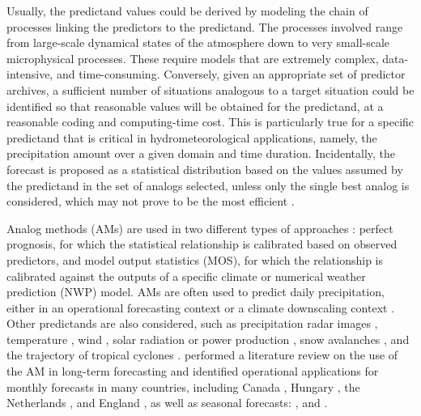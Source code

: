 \documentclass[review]{elsarticle}
\begin{document}
Usually, the predictand values could be derived by modeling the chain of processes linking the predictors to the predictand. The processes involved range from large-scale dynamical states of the atmosphere down to very small-scale microphysical processes. These require models that are extremely complex, data-intensive, and time-consuming. Conversely, given an appropriate set of predictor archives, a sufficient number of situations analogous to a target situation could be identified so that reasonable values will be obtained for the predictand, at a reasonable coding and computing-time cost. This is particularly true for a specific predictand that is critical in hydrometeorological applications, namely, the precipitation amount over a given domain and time duration. Incidentally, the forecast is proposed as a statistical distribution based on the values assumed by the predictand in the set of analogs selected, unless only the single best analog is considered, which may not prove to be the most efficient \citep{Bontron2005}.

Analog methods (AMs) are used in two different types of approaches \citep{Rummukainen1997}: perfect prognosis, for which the statistical relationship is calibrated based on observed predictors, and model output statistics (MOS), for which the relationship is calibrated against the outputs of a specific climate or numerical weather prediction (NWP) model. AMs are often used to predict daily precipitation, either in an operational forecasting context \citep[e.g.][]{Guilbaud1997, Bontron2005, Hamill2006, Bliefernicht2010, Marty2012, Horton2012, Hamill2015, BenDaoud2016} or a climate downscaling context \citep[e.g.][]{Zorita1999, Wetterhall2005, Wetterhall2007, Matulla2007, Radanovics2013, Chardon2014, Dayon2015, Raynaud2016b}. Other predictands are also considered, such as precipitation radar images \citep{Panziera2011,Foresti2015a}, temperature \citep{Radinovic1975, Woodcock1980, Kruizinga1983, DelleMonache2013, Caillouet2016, Raynaud2016b}, wind \citep{Gordon1987, DelleMonache2013, DelleMonache2011, Vanvyve2015, Alessandrini2015, Junk2015, Junk2015c}, solar radiation or power production \citep{Alessandrini2015a, Bessa2015, Raynaud2016b}, snow avalanches \citep{Obled1980, Bolognesi1993}, and the trajectory of tropical cyclones \citep{Keenan1981, Sievers2000, Fraedrich2003}. \citet{Guilbaud1997} performed a literature review on the use of the AM in long-term forecasting and identified operational applications for monthly forecasts in many countries, including Canada \citep{Shabbar1986},  Hungary \citep{Toth1989}, the Netherlands \citep{Nap1981}, and England \citep{Murray1974}, as well as seasonal forecasts: \citet{Barnett1978}, \citet{Bergen1982} and \citet{Livezey1988}.
\end{document}
